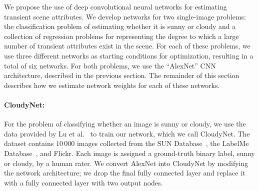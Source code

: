 \documentclass[10pt,twocolumn,letterpaper]{article}
\begin{document}
We propose the use of deep convolutional neural networks for estimating transient
scene attributes. We develop networks for two single-image problems: the
classification problem of estimating whether it is sunny or cloudy and a
collection of regression problems for representing the degree to which a large
number of transient attributes exist in the scene.  For each of these problems,
we use three different networks as starting conditions for optimization,
resulting in a total of six networks.  For both problems, we use the
``AlexNet'' CNN architecture, described in the previous section.  The remainder
of this section describes how we estimate network weights for each of these
networks.


\vspace{-1em}
\paragraph{CloudyNet:} For the problem of classifying whether an image is sunny or
cloudy, we use the data provided by Lu et al.~\cite{lutwoclass} to train our
network, which we call CloudyNet. 
The dataset contains $10\,000$ images collected from the SUN
Database~\cite{xiaoSUN}, the LabelMe Database~\cite{russell2008labelme}, and
Flickr. Each image is assigned a ground-truth binary label,
sunny or cloudy, by a human rater.
We convert AlexNet into CloudyNet by modifying the network
architecture; we 
drop the final fully connected layer and replace it with a
fully connected layer with two output nodes.

\vspace{-1em}
\end{document}
